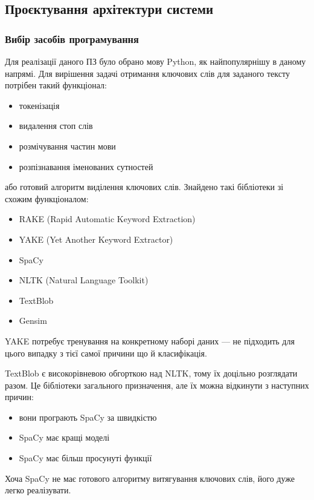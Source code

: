 \documentclass[14pt]{extarticle}
\begin{document}
  \subsection{Проєктування архітектури системи}
  \subsubsection{Вибір засобів програмування}
  Для реалізації даного ПЗ було обрано мову Python,
  як найпопулярнішу в даному напрямі.
  Для вирішення задачі отримання ключових слів для заданого тексту
  потрібен такий функціонал:
  \begin{itemize}[labelindent=\dimexpr{}\relax, leftmargin=*]
    \item токенізація
    \item видалення стоп слів
    \item розмічування частин мови
    \item розпізнавання іменованих сутностей
  \end{itemize}
  або готовий алгоритм виділення ключових слів.
  Знайдено такі бібліотеки зі схожим функціоналом:
  \begin{itemize}[labelindent=\dimexpr{}\relax, leftmargin=*]
    \item RAKE (Rapid Automatic Keyword Extraction)
    \item YAKE (Yet Another Keyword Extractor)
    \item SpaCy
    \item NLTK (Natural Language Toolkit)
    \item TextBlob
    \item Gensim
  \end{itemize}

  YAKE потребує тренування на конкретному наборі даних ---
  не підходить для цього випадку з тієї самої причини що й класифікація.

  TextBlob є високорівневою обгорткою над NLTK,
  тому їх доцільно розглядати разом.
  Це бібліотеки загального призначення,
  але їх можна відкинути з наступних причин:
  \begin{itemize}[labelindent=\dimexpr{}\relax, leftmargin=*]
    \item вони програють SpaCy за швидкістю
    \item SpaCy має кращі моделі
    \item SpaCy має більш просунуті функції
  \end{itemize}

  Хоча SpaCy не має готового алгоритму витягування ключових слів,
  його дуже легко реалізувати.
\end{document}
